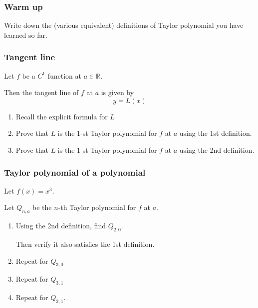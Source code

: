 \documentclass[14pt]{beamer}
\newcommand{\R}{\mathbb{R}}
\newcommand{\p}{\pause}
\newcommand{\vvv}{\vspace{.2cm}}
\begin{document}
	\begin{frame}[t]
		\frametitle{Warm up}

		Write down the (various equivalent) definitions of Taylor polynomial you
		have learned so far.
	\end{frame}
	\begin{frame}[t]
		\frametitle{Tangent line}

		Let $f$ be a $C^{1}$ function at $a \in \R$.

		Then the tangent line of $f$ at $a$ is given by
		\[
			y = L(x)
		\]
		\begin{enumerate}
			\item Recall the explicit formula for $L$

			\item Prove that $L$ is the 1-st Taylor polynomial for $f$ at $a$ using the
				1st definition.

			\item Prove that $L$ is the 1-st Taylor polynomial for $f$ at $a$ using the
				2nd definition.
		\end{enumerate}
	\end{frame}
	\begin{frame}[t]
		\frametitle{Taylor polynomial of a polynomial}

		Let $f(x) = x^{3}$.

		Let $Q_{n,a}$ be the $n$-th Taylor polynomial for $f$ at $a$. \vvv

		\begin{enumerate}
			\item Using the 2nd definition, find $Q_{2,0}$.

				Then verify it also satisfies the 1st definition. \vvv \p

			\item Repeat for $Q_{3,0}$ \vvv

			\item Repeat for $Q_{3,1}$ \vvv

			\item Repeat for $Q_{2,1}$.
		\end{enumerate}
	\end{frame}
\end{document}
